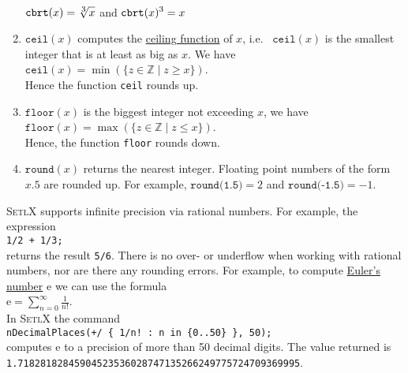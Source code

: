\begin{enumerate}
      \\[0.2cm]
      \hspace*{1.3cm}
      $\displaystyle\texttt{cbrt}(x) = \sqrt[\mbox{\scriptsize$3$}]{x}$ \quad and \quad $\displaystyle\texttt{cbrt}(x)^3 = x$
\item $\texttt{ceil}(x)$ computes the \href{https://en.wikipedia.org/wiki/Floor_and_ceiling_functions}{ceiling
      function} of $x$, i.e.~ $\mathtt{ceil}(x)$ is the smallest integer that is at least as big as $x$.  We have
      \\[0.2cm]
      \hspace*{1.3cm}
      $\texttt{ceil}(x) = \min(\{ z \in \mathbb{Z} \mid z \geq x \})$.
      \\[0.2cm]
      Hence the function \texttt{ceil} rounds up.
\item $\texttt{floor}(x)$ is the biggest integer not exceeding $x$, we have
      \\[0.2cm]
      \hspace*{1.3cm}
      $\texttt{floor}(x) = \max(\{ z \in \mathbb{Z} \mid z \leq x \})$.
      \\[0.2cm]
      Hence, the function \texttt{floor} rounds down.
\item $\texttt{round}(x)$ returns the nearest integer.  Floating point numbers of the form $x.5$ are rounded up.
      For example, $\texttt{round(1.5)}=2$ and $\texttt{round(-1.5)}=-1$.
\end{enumerate}
\textsc{SetlX} supports infinite precision via rational numbers.  For example, the expression
\\[0.2cm]
\hspace*{1.3cm}
\texttt{1/2 + 1/3;}
\\[0.2cm]
returns the result \texttt{5/6}.  There is no over- or underflow when working with rational numbers, nor are
there any rounding errors.  For example, to compute
\href{https://en.wikipedia.org/wiki/E_(mathematical_constant)}{Euler's number} $\mathrm{e}$ we can use the formula
\\[0.2cm]
\hspace*{1.3cm}
$\displaystyle \mathrm{e} = \sum\limits_{n=0}^\infty \frac{1}{n!}$.
\\[0.2cm]
In \textsc{SetlX} the command
\\[0.2cm]
\hspace*{1.3cm}
\texttt{nDecimalPlaces(+/ \{ 1/n! : n in \{0..50\} \}, 50);}
\\[0.2cm]
computes $\mathrm{e}$ to a precision of more than 50 decimal digits.  The value returned is
\\[0.2cm]
\hspace*{1.3cm}
\texttt{1.71828182845904523536028747135266249775724709369995}.



